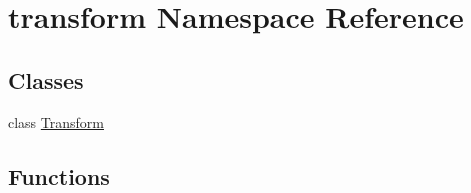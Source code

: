 \hypertarget{namespacetransform}{}\section{transform Namespace Reference}
\label{namespacetransform}
\subsection*{Classes}
\begin{DoxyCompactItemize}
\item 
class \mbox{\hyperlink{classtransform_1_1Transform}{Transform}}
\end{DoxyCompactItemize}
\subsection*{Functions}
